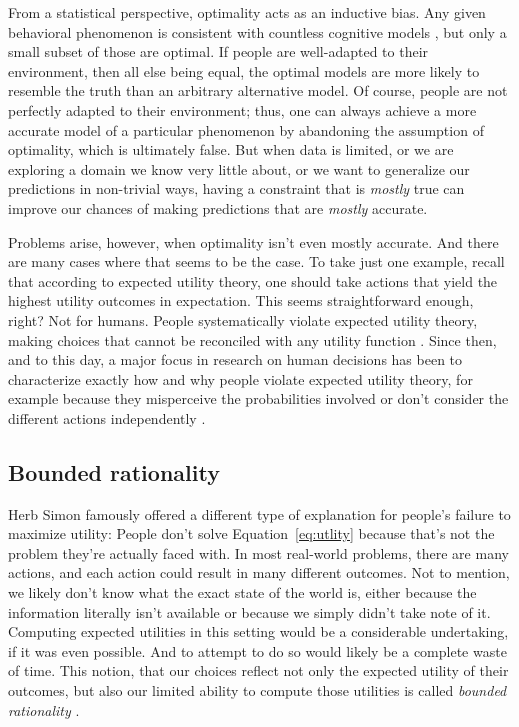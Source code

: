 From a statistical perspective, optimality acts as an inductive bias. Any given behavioral phenomenon is consistent with countless cognitive models \citep{anderson1978arguments}, but only a small subset of those are optimal. If people are well-adapted to their environment, then all else being equal, the optimal models are more likely to resemble the truth than an arbitrary alternative model. Of course, people are not perfectly adapted to their environment; thus, one can always achieve a more accurate model of a particular phenomenon by abandoning the assumption of optimality, which is ultimately false. But when data is limited, or we are exploring a domain we know very little about, or we want to generalize our predictions in non-trivial ways, having a constraint that is \emph{mostly} true can improve our chances of making predictions that are \emph{mostly} accurate.

Problems arise, however, when optimality isn't even mostly accurate. And there are many cases where that seems to be the case. To take just one example, recall that according to expected utility theory, one should take actions that yield the highest utility outcomes in expectation. This seems straightforward enough, right? Not for humans. People systematically violate expected utility theory, making choices that cannot be reconciled with any utility function \citep{allais1953comportement,ellsberg1961risk,kahneman1979prospect}. Since then, and to this day, a major focus in research on human decisions has been to characterize exactly how and why people violate expected utility theory, for example because they misperceive the probabilities involved \citep{kahneman1979prospect} or don't consider the different actions independently \citep{roe2001multialternative}.

\subsection{Bounded rationality}

Herb Simon \citeyearpar{simon1955behavioral} famously offered a different type of explanation for people's failure to maximize utility: People don't solve Equation~\ref{eq:utlity} because that's not the problem they're actually faced with. In most real-world problems, there are many actions, and each action could result in many different outcomes. Not to mention, we likely don't know what the exact state of the world is, either because the information literally isn't available or because we simply didn't take note of it. Computing expected utilities in this setting would be a considerable undertaking, if it was even possible. And to attempt to do so would likely be a complete waste of time. This notion, that our choices reflect not only the expected utility of their outcomes, but also our limited ability to compute those utilities is called \emph{bounded rationality} \citep{simon1990bounded}.

